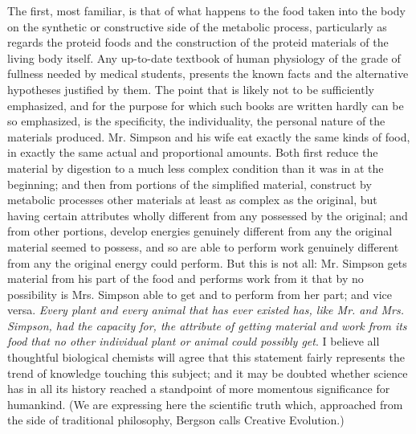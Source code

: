 \documentclass[a4paper, 11pt, oneside, polutonikogreek, english]{article}
\begin{document}
The first, most familiar, is that of what happens to the food taken into the body on the synthetic or constructive side of the metabolic process, particularly as regards the proteid foods and the construction of the proteid materials of the living body itself. Any up-to-date textbook of human physiology of the grade of fullness needed by medical students, presents the known facts and the alternative hypotheses justified by them. The point that is likely not to be sufficiently emphasized, and for the purpose for which such books are written hardly can be so emphasized, is the specificity, the individuality, the personal nature of the materials produced. Mr. Simpson and his wife eat exactly the same kinds of food, in exactly the same actual and proportional amounts. Both first reduce the material by digestion to a much less complex condition than it was in at the beginning; and then from portions of the simplified material, construct by metabolic processes other materials at least as complex as the original, but having certain attributes wholly different from any possessed by the original; and from other portions, develop energies genuinely different from any the original material seemed to possess, and so are able to perform work genuinely different from any the original energy could perform. But this is not all: Mr. Simpson gets material from his part of the food and performs work from it that by no possibility is Mrs. Simpson able to get and to perform from her part; and vice versa. \emph{Every plant and every animal that has ever existed has, like Mr. and Mrs. Simpson, had the capacity for, the attribute of getting material and work from its food that no other individual plant or animal could possibly get}. I believe all thoughtful biological chemists will agree that this statement fairly represents the trend of knowledge touching this subject; and it may be doubted whether science has in all its history reached a standpoint of more momentous significance for humankind. (We are expressing here the scientific truth which, approached from the side of traditional philosophy, Bergson calls Creative Evolution.)
\end{document}
